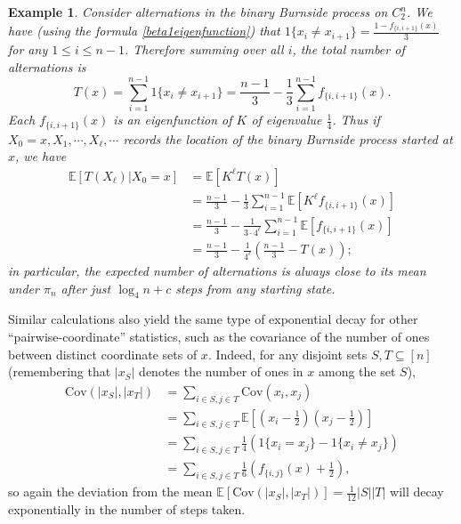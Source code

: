 \documentclass[11pt]{article}
\newcounter{r}
\newcounter{s}
\numberwithin{equation}{section}
\newtheorem{example}[theorem]{Example}
\begin{document}
\begin{example}
Consider alternations in the binary Burnside process on $C_2^n$. We have (using the formula \cref{beta1eigenfunction}) that $1\{x_i \ne x_{i+1}\} = \frac{1 - f_{\{i,i+1\}}(x)}{3}$ for any $1 \le i \le n-1$. Therefore summing over all $i$, the total number of alternations is
\[
    T(x) = \sum_{i=1}^{n-1}1\{x_i \ne x_{i+1}\} = \frac{n-1}{3} - \frac{1}{3} \sum_{i=1}^{n-1} f_{\{i,i+1\}}(x).
\]
Each $f_{\{i,i+1\}}(x)$ is an eigenfunction of $K$ of eigenvalue $\frac{1}{4}$. Thus if $X_0 = x, X_1, \cdots, X_\ell, \cdots$ records the location of the binary Burnside process started at $x$, we have
\begin{align*}
    \mathbb{E}[T(X_\ell) | X_0 = x] &= \mathbb{E}[K^\ell T(x)] \\
    &= \frac{n-1}{3} - \frac{1}{3}\sum_{i=1}^{n-1} \mathbb{E}[K^\ell f_{\{i,i+1\}}(x)] \\
    &= \frac{n-1}{3} - \frac{1}{3 \cdot 4^\ell} \sum_{i=1}^{n-1} \mathbb{E}[f_{\{i,i+1\}}(x)] \\
    &= \frac{n-1}{3} - \frac{1}{4^\ell}\left(\frac{n-1}{3} - T(x)\right);
\end{align*}
in particular, the expected number of alternations is always close to its mean under $\pi_n$ after just $\log_4 n + c$ steps from any starting state.
\end{example}

Similar calculations also yield the same type of exponential decay for other ``pairwise-coordinate'' statistics, such as the covariance of the number of ones between distinct coordinate sets of $x$. Indeed, for any disjoint sets $S, T \subseteq [n]$ (remembering that $|x_S|$ denotes the number of ones in $x$ among the set $S$),
\begin{align*}
    \text{Cov}(|x_S|, |x_T|) &= \sum_{i \in S, j \in T} \text{Cov}(x_i, x_j) \\
    &= \sum_{i \in S, j \in T} \mathbb{E}\left[\left(x_i - \frac{1}{2}\right) \left(x_j - \frac{1}{2}\right) \right] \\
    &= \sum_{i \in S, j \in T} \frac{1}{4} \left(1\{x_i = x_j\} - 1\{x_i \ne x_j\} \right) \\
    &= \sum_{i \in S, j \in T} \frac{1}{6} \left(f_{\{i,j\}}(x) + \frac{1}{2}\right),
\end{align*}
so again the deviation from the mean $\mathbb{E}[\text{Cov}(|x_S|, |x_T|)] = \frac{1}{12}|S||T|$ will decay exponentially in the number of steps taken.

\medskip
\end{document}
